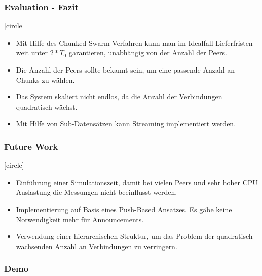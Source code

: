 
\begin{frame}
  \frametitle{Evaluation - Fazit}
  [circle]
  \begin{itemize}
	  \item Mit Hilfe des Chunked-Swarm Verfahren kann man im Idealfall Lieferfristen weit unter $2*T_0$ garantieren, unabhängig von der Anzahl der Peers.
	  \item Die Anzahl der Peers sollte bekannt sein, um eine passende Anzahl an Chunks zu wählen.
	  \item Das System skaliert nicht endlos, da die Anzahl der Verbindungen quadratisch wächst.
	  \item Mit Hilfe von Sub-Datensätzen kann Streaming implementiert werden.
  \end{itemize}
\end{frame}


\begin{frame}
  \frametitle{Future Work}
  [circle]
  \begin{itemize}
	  \item Einführung einer Simulationszeit, damit bei vielen Peers und sehr hoher CPU Auslastung die Messungen nicht beeinflusst werden.
	  \item Implementierung auf Basis eines Push-Based Ansatzes. Es gäbe keine Notwendigkeit mehr für Announcements.
	  \item Verwendung einer hierarchischen Struktur, um das Problem der quadratisch wachsenden Anzahl an Verbindungen zu verringern.
  \end{itemize}
\end{frame}



\begin{frame}
  \frametitle{Demo}
\end{frame}



